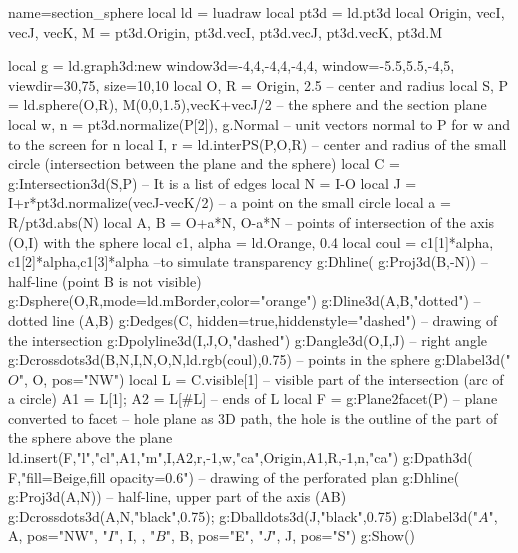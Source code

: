 \begin{luadraw}{name=section_sphere}
local ld = luadraw
local pt3d = ld.pt3d
local Origin, vecI, vecJ, vecK, M = pt3d.Origin, pt3d.vecI, pt3d.vecJ, pt3d.vecK, pt3d.M

local g = ld.graph3d:new{ window3d={-4,4,-4,4,-4,4}, window={-5.5,5.5,-4,5}, viewdir={30,75}, size={10,10}}
local O, R = Origin, 2.5 -- center and radius
local S, P = ld.sphere(O,R), {M(0,0,1.5),vecK+vecJ/2} -- the sphere and the section plane
local w, n = pt3d.normalize(P[2]), g.Normal -- unit vectors normal to P for w and to the screen for n
local I, r = ld.interPS(P,{O,R}) -- center and radius of the small circle (intersection between the plane and the sphere)
local C = g:Intersection3d(S,P) -- It is a list of edges
local N = I-O
local J = I+r*pt3d.normalize(vecJ-vecK/2) -- a point on the small circle
local a = R/pt3d.abs(N)
local A, B = O+a*N, O-a*N -- points of intersection of the axis (O,I) with the sphere
local c1, alpha = ld.Orange, 0.4
local coul = {c1[1]*alpha, c1[2]*alpha,c1[3]*alpha} --to simulate transparency
g:Dhline( g:Proj3d({B,-N})) -- half-line (point B is not visible)
g:Dsphere(O,R,{mode=ld.mBorder,color="orange"})
g:Dline3d(A,B,"dotted") -- dotted line (A,B)
g:Dedges(C, {hidden=true,hiddenstyle="dashed"}) -- drawing of the intersection
g:Dpolyline3d({I,J,O},"dashed")
g:Dangle3d(O,I,J) -- right angle
g:Dcrossdots3d({{B,N},{I,N},{O,N}},ld.rgb(coul),0.75) -- points in the sphere
g:Dlabel3d("$O$", O, {pos="NW"})
local L = C.visible[1] -- visible part of the intersection (arc of a circle)
A1 = L[1]; A2 = L[#L] -- ends of L
local F = g:Plane2facet(P) -- plane converted to facet
-- hole plane as 3D path, the hole is the outline of the part of the sphere above the plane
ld.insert(F,{"l","cl",A1,"m",I,A2,r,-1,w,"ca",Origin,A1,R,-1,n,"ca"})
g:Dpath3d( F,"fill=Beige,fill opacity=0.6") -- drawing of the perforated plan
g:Dhline( g:Proj3d({A,N})) -- half-line, upper part of the axis (AB)
g:Dcrossdots3d({A,N},"black",0.75); g:Dballdots3d(J,"black",0.75)
g:Dlabel3d("$A$", A, {pos="NW"}, "$I$", I, {}, "$B$", B, {pos="E"}, "$J$", J, {pos="S"})
g:Show()
\end{luadraw}
